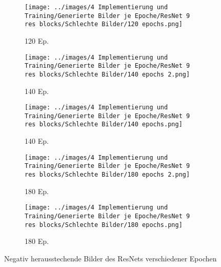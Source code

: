 \begin{figure}[h]
    \centering
    \begin{subfigure}[b]{0.12\textwidth}
        \centering
        \texttt{[image: ../images/4 Implementierung und Training/Generierte Bilder je Epoche/ResNet 9 res blocks/Schlechte Bilder/120 epochs.png]}
        \caption{120 Ep.}
    \end{subfigure}
    \hspace{3em}%
    \begin{subfigure}[b]{0.12\textwidth}
        \centering
        \texttt{[image: ../images/4 Implementierung und Training/Generierte Bilder je Epoche/ResNet 9 res blocks/Schlechte Bilder/140 epochs 2.png]}
        \caption{140 Ep.}
    \end{subfigure}
    \hspace{3em}%
    \begin{subfigure}[b]{0.12\textwidth}
        \centering
        \texttt{[image: ../images/4 Implementierung und Training/Generierte Bilder je Epoche/ResNet 9 res blocks/Schlechte Bilder/140 epochs.png]}
        \caption{140 Ep.}
    \end{subfigure}
    \hspace{3em}%
    \begin{subfigure}[b]{0.12\textwidth}
        \centering
        \texttt{[image: ../images/4 Implementierung und Training/Generierte Bilder je Epoche/ResNet 9 res blocks/Schlechte Bilder/180 epochs 2.png]}
        \caption{180 Ep.}
    \end{subfigure}
    \hspace{3em}%
    \begin{subfigure}[b]{0.12\textwidth}
    \centering
    \texttt{[image: ../images/4 Implementierung und Training/Generierte Bilder je Epoche/ResNet 9 res blocks/Schlechte Bilder/180 epochs.png]}
    \caption{180 Ep.}
\end{subfigure}
        \caption{Negativ herausstechende Bilder des ResNets verschiedener Epochen}
        \label{fig:resnet-schlechte-bilder}
\end{figure}

